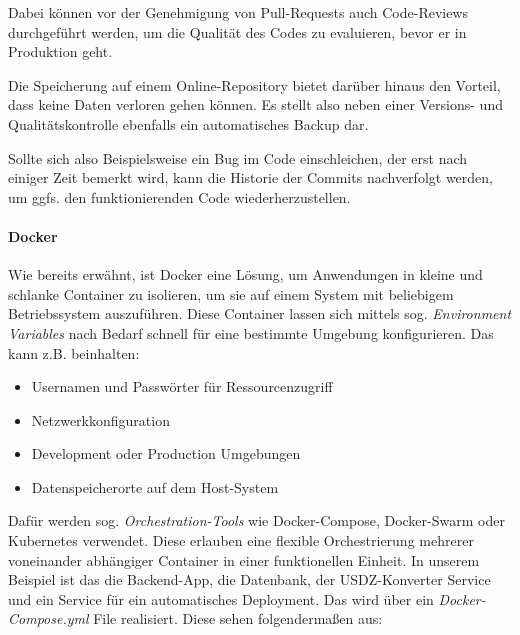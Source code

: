 \documentclass[titlepage, a4paper, 11pt]{scrartcl}
\begin{document}
          Dabei können vor der Genehmigung von Pull-Requests auch Code-Reviews durchgeführt werden, um die Qualität des Codes zu evaluieren,
          bevor er in Produktion geht.
          
          Die Speicherung auf einem Online-Repository bietet darüber hinaus den Vorteil, dass keine Daten verloren gehen können.
          Es stellt also neben einer Versions- und Qualitätskontrolle ebenfalls ein automatisches Backup dar.

          Sollte sich also Beispielsweise ein Bug im Code einschleichen, der erst nach einiger Zeit bemerkt wird, kann die Historie
          der Commits nachverfolgt werden, um ggfs. den funktionierenden Code wiederherzustellen.

        \paragraph{Docker}

          Wie bereits erwähnt, ist Docker eine Lösung, um Anwendungen in kleine und schlanke Container zu isolieren, um sie auf einem System mit beliebigem 
          Betriebssystem auszuführen. Diese Container lassen sich mittels sog. \textit{Environment Variables} nach Bedarf schnell für eine bestimmte Umgebung konfigurieren.
          Das kann z.B. beinhalten:

          \begin{itemize}
            \item Usernamen und Passwörter für Ressourcenzugriff
            \item Netzwerkkonfiguration
            \item Development oder Production Umgebungen
            \item Datenspeicherorte auf dem Host-System
          \end{itemize}

          Dafür werden sog. \textit{Orchestration-Tools} wie Docker-Compose, Docker-Swarm oder Kubernetes verwendet. 
          Diese erlauben eine flexible Orchestrierung mehrerer voneinander abhängiger Container in einer funktionellen Einheit.
          In unserem Beispiel ist das die Backend-App, die Datenbank, der USDZ-Konverter Service und ein Service für ein automatisches Deployment.
          Das wird über ein \textit{Docker-Compose.yml} File realisiert. Diese sehen folgendermaßen aus:
\end{document}
